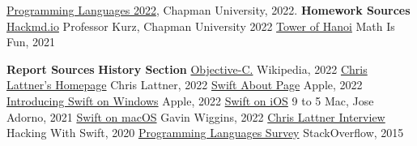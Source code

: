 \documentclass{article}
\theoremstyle{theorem}
\theoremstyle{definition}
\theoremstyle{remark}
\begin{document}
\begin{thebibliography}{99}

 \href{https://github.com/alexhkurz/programming-languages-2022/blob/main/README.md}{Programming Languages 2022}, Chapman University, 2022.\newline
\newline
\textbf{Homework Sources} \newline
\href{https://hackmd.io/@alexhkurz/H1jUka4Gv#fn2}{Hackmd.io} Professor Kurz, Chapman University 2022\newline\newline
\href{https://www.mathsisfun.com/games/towerofhanoi.html}{Tower of Hanoi} Math Is Fun, 2021 \newline

\textbf{Report Sources}\newline
\textbf{History Section}\newline
\href{https://en.wikipedia.org/wiki/Objective-C#:~:text=10%20External%20links-,History,Programming%20Technology%20Center%20in%201981.}{Objective-C.} Wikipedia, 2022\newline
\href{https://nondot.org/~sabre/}{Chris Lattner's Homepage} Chris Lattner, 2022\newline
\href{https://www.swift.org/about/}{Swift About Page} Apple, 2022\newline
\href{https://www.swift.org/blog/swift-on-windows/}{Introducing Swift on Windows} Apple, 2022\newline
\href{https://9to5mac.com/2021/12/15/apple-releases-long-awaited-swift-playgrounds-update-with-the-ability-to-create-apps-using-ipad/}{Swift on iOS} 9 to 5 Mac, Jose Adorno, 2021 \newline
\href{https://gavinw.me/swift-macos/}{Swift on macOS} Gavin Wiggins, 2022 \newline
\href{https://www.hackingwithswift.com/interviews/chris-lattner-how-did-you-start-creating-swift}{Chris Lattner Interview} Hacking With Swift, 2020\newline
\href{https://stackoverflow.blog/2015/04/07/stack-overflow-developer-survey-2015-the-results/}{Programming Languages Survey} StackOverflow, 2015\newline


\end{thebibliography}
\end{document}
